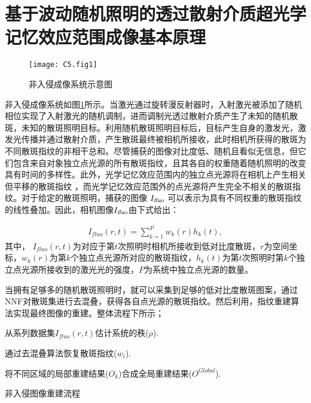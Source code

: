 \section{基于波动随机照明的透过散射介质超光学记忆效应范围成像基本原理}

\begin{figure}[htp]
	\centering
	\texttt{[image: C5.fig1]}
	\caption{非入侵成像系统示意图}
	\label{fig:5.1}
\end{figure}

非入侵成像系统如图\ref{fig:5.1}所示。当激光通过旋转漫反射器时，入射激光被添加了随机相位实现了入射激光的随机调制，进而调制光透过散射介质产生了未知的随机散斑，未知的散斑照明目标。利用随机散斑照明目标后，目标产生自身的激发光，激发光传播并通过散射介质，产生散斑最终被相机所接收，此时相机所获得的散斑为不同散斑指纹的非相干总和。尽管捕获的图像对比度低、随机且看似无信息，但它们包含来自对象独立点光源的所有散斑指纹，且其各自的权重随着随机照明的改变具有时间的多样性。此外，光学记忆效应范围内的独立点光源将在相机上产生相关但平移的散斑指纹 \cite{Freund1988}，而光学记忆效应范围外的点光源将产生完全不相关的散斑指纹。对于给定的散斑照明，捕获的图像 $I_{\textsl{fluo}}$ 可以表示为具有不同权重的散斑指纹的线性叠加。因此，相机图像$I_{\textsl{fluo}}$由下式给出：

\begin{equation}
\begin{aligned}
I_{fluo}(r,t) = \sum^{P}_{k=1} w_{k}(r) h_{k}(t),
\label{eq:5.1}
\end{aligned}
\end{equation}
其中， $I_{fluo}(r,t)$为对应于第$t$次照明时相机所接收到低对比度散斑，$r$为空间坐标，$w_{k}(r)$为第$k$个独立点光源所对应的散斑指纹，$h_{k}(t)$为第$t$次照明时第$k$个独立点光源所接收到的激光光的强度，$P$为系统中独立点光源的数量。

当拥有足够多的随机散斑照明时，就可以采集到足够的低对比度散斑图案，通过NNF对散斑集进行去混叠，获得各自点光源的散斑指纹。然后利用，指纹重建算法实现最终图像的重建。整体流程下所示；
\begin{algorithm2e}[h!]
\DontPrintSemicolon
\SetAlgoLined
{}
从系列数据集$I_{fluo}(r,t)$估计系统的秩($\rho$).\;

通过去混叠算法恢复散斑指纹($w_{i}$).\;


将不同区域的局部重建结果($O_{k}$)合成全局重建结果($O^{Global}$).\;

\caption{非入侵图像重建流程}
\label{alg:a1}
\end{algorithm2e}

